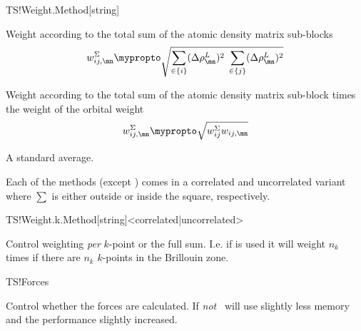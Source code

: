 \begin{fdfentry}{TS!Weight.Method}[string]
\begin{fdfoptions}
    
    Weight according to the total sum of the atomic density matrix
    sub-blocks
    \begin{equation}
      w_{ij,\mn}^{\Sigma} \mypropto
      \sqrt{
          \sum_{\in\{i\}}(\Delta\rho_{\mn}^L)^2
          \; %
          \sum_{\in\{j\}}(\Delta\rho_{\mn}^L)^2
      }
    \end{equation}

    
    Weight according to the total sum of the atomic density matrix
    sub-block times the weight of the orbital weight
    \begin{equation}
      w_{ij,\mn}^{\Sigma} \mypropto
      \sqrt{
          w_{ij}^{\Sigma} 
          w_{ij,\mn}
      }
    \end{equation}

    \option[mean]%
    
    A standard average.
    
  \end{fdfoptions}


  Each of the methods (except ) comes in a correlated and
  uncorrelated variant where $\sum$ is either outside or inside the
  square, respectively.

\end{fdfentry}

\begin{fdfentry}{TS!Weight.k.Method}[string]<correlated|uncorrelated>

  Control weighting \emph{per} $k$-point or the full sum. I.e. if
   is used it will weight $n_k$ times if there are
  $n_k$ $k$-points in the Brillouin zone.
  
\end{fdfentry}

\begin{fdflogicalT}{TS!Forces}
  
  Control whether the forces are calculated. If \emph{not} \tsiesta\
  will use slightly less memory and the performance slightly
  increased.

\end{fdflogicalT}

